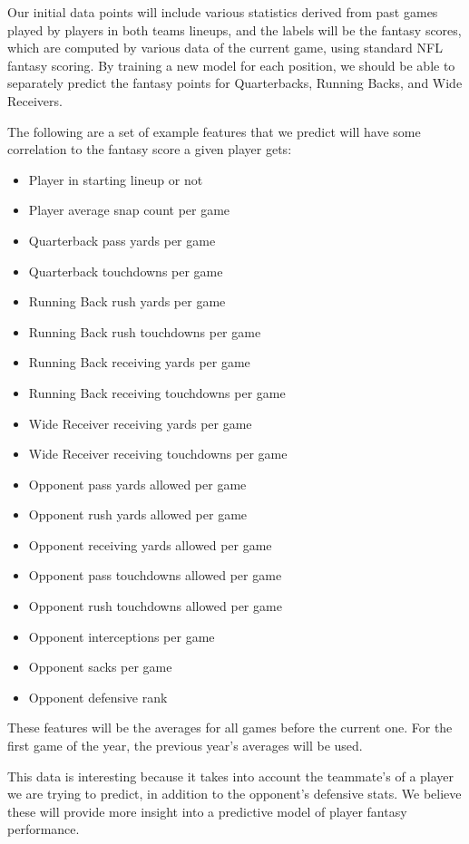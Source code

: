 \documentclass[11pt,a4paper]{article}
\begin{document}
Our initial data points will include various statistics derived from past games played by players in both teams lineups, and the labels will be the fantasy scores, which are computed by various data of the current game, using standard NFL fantasy scoring. By training a new model for each position, we should be able to separately predict the fantasy points for Quarterbacks, Running Backs, and Wide Receivers.

The following are a set of example features that we predict will have some correlation to the fantasy score a given player gets:
\begin{itemize}
\item
Player in starting lineup or not
\item
Player average snap count per game
\item
Quarterback pass yards per game
\item
Quarterback touchdowns per game
\item
Running Back rush yards per game
\item
Running Back rush touchdowns per game
\item
Running Back receiving yards per game
\item
Running Back receiving touchdowns per game
\item
Wide Receiver receiving yards per game
\item
Wide Receiver receiving touchdowns per game
\item
Opponent pass yards allowed per game
\item
Opponent rush yards allowed per game
\item
Opponent receiving yards allowed per game
\item
Opponent pass touchdowns allowed per game
\item
Opponent rush touchdowns allowed per game
\item
Opponent interceptions per game
\item
Opponent sacks per game
\item
Opponent defensive rank
\end{itemize}

These features will be the averages for all games before the current one. For the first game of the year, the previous year’s averages will be used.

This data is interesting because it takes into account the teammate’s of a player we are trying to predict, in addition to the opponent’s defensive stats. We believe these will provide more insight into a predictive model of player fantasy performance.
\end{document}
